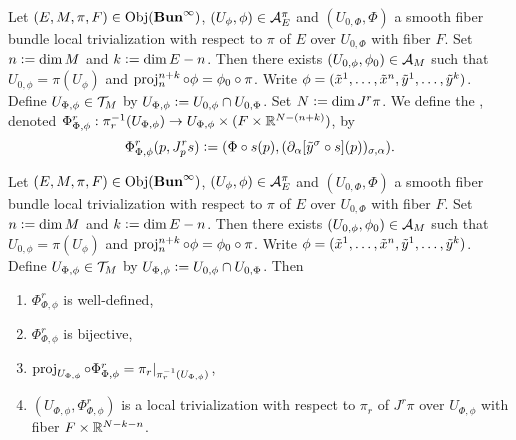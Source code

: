 \documentclass{book}
\begin{document}
\begin{defn}
	Let $(E, M, \pi, F) \in \operatorname{Obj}(\operatorname*{\text{\textbf{Bun}}^{\infty}})$, $(U_{\phi}, \phi) \in \mathcal{A}_E^{\pi}$ and $(U_{0, \Phi}, \Phi)$ a smooth fiber bundle local trivialization with respect to $\pi$ of $E$ over $U_{0, \Phi}$ with fiber $F$. Set $n \vcentcolon= \dim M$ and $k \vcentcolon= \dim E - n$. Then there exists $(U_{0, \phi}, \phi_0) \in \mathcal{A}_M$ such that $U_{0, \phi} = \pi(U_{\phi})$ and $\operatorname{\text{proj}}^{n+k}_{n} \circ \phi = \phi_0 \circ \pi$. Write $\phi = (\tilde{x}^1, \ldots, \tilde{x}^n, \tilde{y}^1, \ldots, \tilde{y}^k)$. Define $U_{\Phi, \phi} \in \mathcal{T}_M$ by $U_{\Phi, \phi} \vcentcolon= U_{0, \phi} \cap U_{0, \Phi}$. Set $N \vcentcolon= \dim J^r \pi$. We define the , denoted $\Phi^r_{\Phi, \phi}:\pi_r^{-1}(U_{\Phi, \phi}) \rightarrow U_{\Phi, \phi} \times (F \times \mathbb{R}^{N-(n+k)})$, by 
	$$\Phi^r_{\Phi, \phi}(p, J^r_p s) \vcentcolon= (\Phi \circ s(p), (\partial_{\alpha}[\tilde{y}^{\sigma} \circ s](p))_{\sigma, \alpha}).$$
\end{defn}

\begin{ex}
	Let $(E, M, \pi, F) \in \operatorname{Obj}(\operatorname*{\text{\textbf{Bun}}^{\infty}})$, $(U_{\phi}, \phi) \in \mathcal{A}_E^{\pi}$ and $(U_{0, \Phi}, \Phi)$ a smooth fiber bundle local trivialization with respect to $\pi$ of $E$ over $U_{0, \Phi}$ with fiber $F$. Set $n \vcentcolon= \dim M$ and $k \vcentcolon= \dim E - n$. Then there exists $(U_{0, \phi}, \phi_0) \in \mathcal{A}_M$ such that $U_{0, \phi} = \pi(U_{\phi})$ and $\operatorname{\text{proj}}^{n+k}_{n} \circ \phi = \phi_0 \circ \pi$. Write $\phi = (\tilde{x}^1, \ldots, \tilde{x}^n, \tilde{y}^1, \ldots, \tilde{y}^k)$. Define $U_{\Phi, \phi} \in \mathcal{T}_M$ by $U_{\Phi, \phi} \vcentcolon= U_{0, \phi} \cap U_{0, \Phi}$. Then 
	\begin{enumerate}
		\item $\Phi^r_{\Phi, \phi}$ is well-defined,
		\item $\Phi^r_{\Phi, \phi}$ is bijective,
		\item $\operatorname{\text{proj}}_{U_{\Phi, \phi}} \circ \Phi^r_{\Phi, \phi} = \pi_r|_{\pi_r^{-1}(U_{\Phi, \phi})}$,
		\item $(U_{\Phi, \phi}, \Phi^r_{\Phi, \phi})$ is a local trivialization with respect to $\pi_r$ of $J^r \pi$ over $U_{\Phi, \phi}$ with fiber $F \times \mathbb{R}^{N-k-n}$.
	\end{enumerate}
\end{ex}
\end{document}
